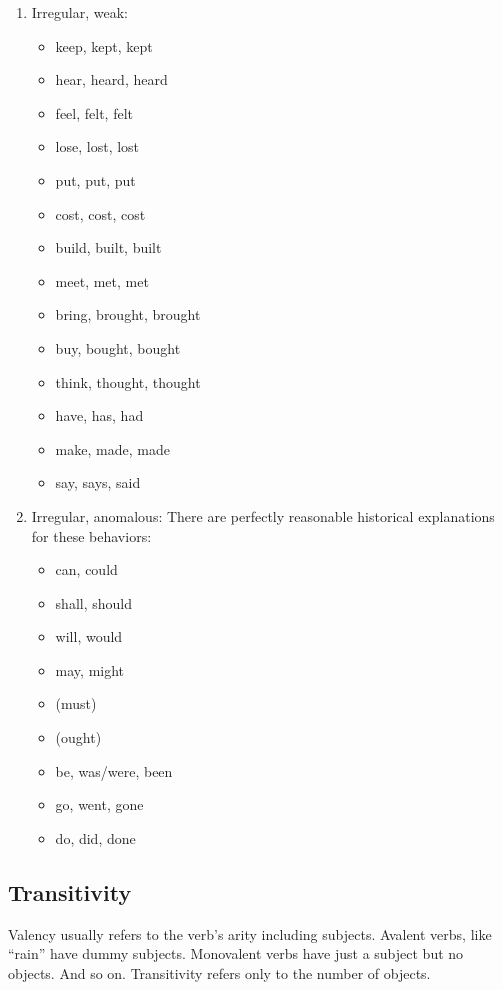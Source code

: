 \documentclass{article}
\begin{document}
\begin{enumerate}
\item Irregular, weak:

\begin{itemize}
\item keep, kept, kept
\item hear, heard, heard
\item feel, felt, felt
\item lose, lost, lost
\item put, put, put
\item cost, cost, cost
\item build, built, built
\item meet, met, met
\item bring, brought, brought
\item buy, bought, bought
\item think, thought, thought
\item have, has, had
\item make, made, made
\item say, says, said
\end{itemize}

\item Irregular, anomalous:
There are perfectly reasonable historical explanations for these behaviors:

\begin{itemize}
\item can, could
\item shall, should
\item will, would
\item may, might
\item (must)
\item (ought)
\item be, was/were, been
\item go, went, gone
\item do, did, done
\end{itemize}
\end{enumerate}

\subsection{Transitivity}

Valency usually refers to the verb's arity including subjects. Avalent verbs, like ``rain'' have dummy subjects. Monovalent verbs have just a subject but no objects. And so on. Transitivity refers only to the number of objects.
\end{document}
